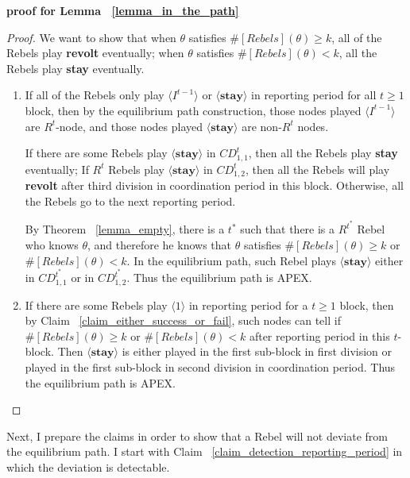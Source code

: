 \documentclass[12pt,letterpaper]{article}
\theoremstyle{definition}
\theoremstyle{remark}
\theoremstyle{claim}
\begin{document}
\noindent \textbf{proof for Lemma ~\ref{lemma_in_the_path}}
\begin{proof}
We want to show that when $\theta$ satisfies $\#[Rebels](\theta)\geq k$, all of the Rebels play \textbf{revolt} eventually; when $\theta$ satisfies $\#[Rebels](\theta)< k$, all the Rebels play \textbf{stay} eventually.
\begin{enumerate}
\item If all of the Rebels only play $\langle I^{t-1} \rangle$ or $\langle \textbf{stay} \rangle$ in reporting period for all $t\geq 1$ block, then by the equilibrium path construction, those nodes played $\langle I^{t-1} \rangle$ are $R^t$-node, and those nodes played $\langle \textbf{stay} \rangle$ are non-$R^t$ nodes. 

If there are some Rebels play $\langle \textbf{stay} \rangle$ in $CD^t_{1,1}$, then all the Rebels play \textbf{stay} eventually; If $R^t$ Rebels play $\langle \textbf{stay} \rangle$ in $CD^t_{1,2}$, then all the Rebels will play \textbf{revolt} after third division in coordination period in this block. Otherwise, all the Rebels go to the next reporting period.

By Theorem ~\ref{lemma_empty}, there is a $t^{*}$ such that there is a $R^{t^{*}}$ Rebel who knows $\theta$, and therefore he knows that $\theta$ satisfies $\#[Rebels](\theta)\geq k$ or $\#[Rebels](\theta)< k$. In the equilibrium path, such Rebel plays $\langle \textbf{stay} \rangle$ either in $CD^{t^{*}}_{1,1}$ or in $CD^{t^{*}}_{1,2}$. Thus the equilibrium path is APEX.

\item If there are some Rebels play $\langle 1 \rangle$ in reporting period for a $t\geq 1$ block, then by Claim ~\ref{claim_either_success_or_fail}, such nodes can tell if $\#[Rebels](\theta)\geq k$ or $\#[Rebels](\theta)< k$ after reporting period in this $t$-block. Then $\langle \textbf{stay} \rangle$ is either played in the first sub-block in first division or played in the first sub-block in second division in coordination period. Thus the equilibrium path is APEX.

 
\end{enumerate}

\end{proof}



Next, I prepare the claims in order to show that a Rebel will not deviate from the equilibrium path. I start with Claim ~\ref{claim_detection_reporting_period} in which the deviation is detectable.
\end{document}
